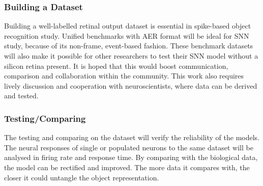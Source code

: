 \subsubsection{Building a Dataset}
Building a well-labelled retinal output dataset is essential in spike-based object recognition study.
Unified benchmarks with AER format will be ideal for SNN study, because of its non-frame, event-based fashion.
These benchmark datasets will also make it possible for other researchers to test their SNN model without a silicon retina present.
It is hoped that this would boost communication, comparison and collaboration within the community.
This work also requires lively discussion and cooperation with neuroscientists, where data can be derived and tested.
\subsubsection{Testing/Comparing}
The testing and comparing on the dataset will verify the reliability of the models.
The neural responses of single or populated neurons to the same dataset will be analysed in firing rate and response time.
By comparing with the biological data, the model can be rectified and improved.
The more data it compares with, the closer it could untangle the object representation. 



